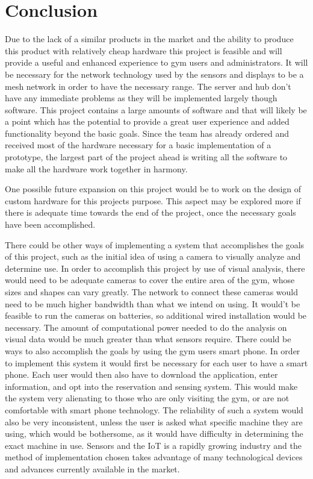 \documentclass[PPFS.tex]{template/subfiles}
\begin{document}
\section{Conclusion}
Due to the lack of a similar products in the market and the ability to produce this product with relatively cheap hardware this project is feasible and will provide a useful and enhanced experience to gym users and administrators. It will be necessary for the network technology used by the sensors and displays to be a mesh network in order to have the necessary range. The server and hub don't have any immediate problems as they will be implemented largely though software. This project contains a large amounts of software and that will likely be a point which has the potential to provide a great user experience and added functionality beyond the basic goals. Since the team has already ordered and received most of the hardware necessary for a basic implementation of a prototype, the largest part of the project ahead is writing all the software to make all the hardware work together in harmony. 

One possible future expansion on this project would be to work on the design of custom hardware for this projects purpose. This aspect may be explored more if there is adequate time towards the end of the project, once the necessary goals have been accomplished. 

There could be other ways of implementing a system that accomplishes the goals of this project, such as the initial idea of using a camera to visually analyze and determine use. In order to accomplish this project by use of visual analysis, there would need to be adequate cameras to cover the entire area of the gym, whose sizes and shapes can vary greatly. The network to connect these cameras would need to be much higher bandwidth than what we intend on using. It would't be feasible to run the cameras on batteries, so additional wired installation would be necessary. The amount of computational power needed to do the analysis on visual data would be much greater than what sensors require. There could be ways to also accomplish the goals by using the gym users smart phone. In order to implement this system it would first be necessary for each user to have a smart phone. Each user would then also have to download the application, enter information, and opt into the reservation and sensing system. This would make the system very alienating to those who are only visiting the gym, or are not comfortable with smart phone technology. The reliability of such a system would also be very inconsistent, unless the user is asked what specific machine they are using, which would be bothersome, as it would have difficulty in determining the exact machine in use. Sensors and the IoT is a rapidly growing industry and the method of implementation chosen takes advantage of many technological devices and advances currently available in the market. 
\end{document}
